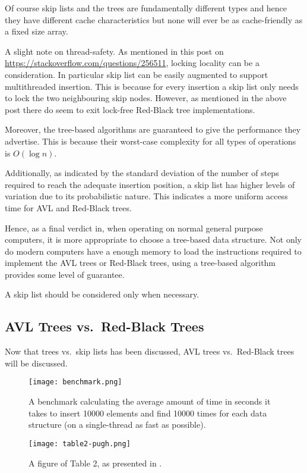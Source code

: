 \documentclass[article]{uom-coursework}
\begin{document}
Of course skip lists and the trees are fundamentally different
types and hence they have different cache characteristics but
none will ever be as cache-friendly as a fixed size array.

A slight note on thread-safety. As mentioned in this post on
\url{https://stackoverflow.com/questions/256511}, locking
locality can be a consideration. In particular skip list can be
easily augmented to support multithreaded insertion. This is
because for every insertion a skip list only needs to lock the
two neighbouring skip nodes. However, as mentioned in the above
post there do seem to exit lock-free Red-Black tree
implementations.

Moreover, the tree-based algorithms are guaranteed to give the
performance they advertise. This is because
their worst-case complexity for all types of operations
is $O(\log n)$.

Additionally, as indicated by the standard deviation of the
number of steps required to reach the adequate insertion
position, a skip list has higher levels of variation due to its
probabilistic nature. This indicates a more uniform access time
for AVL and Red-Black trees.

Hence, as a final verdict in, when operating on normal general
purpose computers, it is more appropriate to choose a tree-based
data structure. Not only do modern computers
have a enough memory to load the instructions required
to implement the AVL trees or Red-Black trees, using
a tree-based algorithm provides some level of guarantee.

A skip list should be considered only when necessary.

\subsection{AVL Trees vs.\ Red-Black Trees}

Now that trees vs.\ skip lists has been discussed, AVL trees
vs.\ Red-Black trees will be discussed.

\begin{figure}[H]
\centering
\texttt{[image: benchmark.png]}
\caption{A benchmark calculating the average amount of time in
seconds it takes to insert 10000 elements and find 10000 times
for each data structure (on a single-thread as fast as
possible).}
\label{fig:benchmark}
\end{figure}

\begin{figure}[H]
\centering
\texttt{[image: table2-pugh.png]}
\caption{A figure of Table 2, as presented in \textcite{pugh90}.}
\label{fig:test9}
\end{figure}
\end{document}
